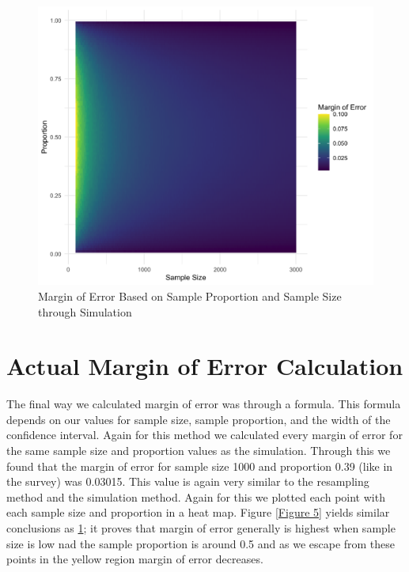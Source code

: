 \documentclass{article}\usepackage[]{graphicx}\usepackage[]{xcolor}
\begin{document}
\begin{multicols}{2}
\begin{figure}[H]
\begin{center}
\includegraphics[scale=0.14]{fourth.png}
\caption{Margin of Error Based on Sample Proportion and Sample Size through Simulation}
\label{Figure 4}
\end{center}
\end{figure}

\section{Actual Margin of Error Calculation}
The final way we calculated margin of error was through a formula. This formula depends on our values for sample size, sample proportion, and the width of the confidence interval. Again for this method we calculated every margin of error for the same sample size and proportion values as the simulation. Through this we found that the margin of error for sample size 1000 and proportion 0.39 (like in the survey) was 0.03015. This value is again very similar to the resampling method and the simulation method. Again for this we plotted each point with each sample size and proportion in a heat map. Figure \ref{Figure 5} yields similar conclusions as \ref{Figure 4}; it proves that margin of error generally is highest when sample size is low nad the sample proportion is around 0.5 and as we escape from these points in the yellow region margin of error decreases. 


\end{multicols}
\end{document}
